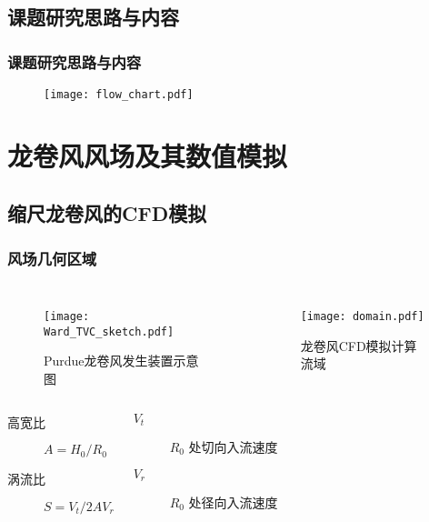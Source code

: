 \subsection{课题研究思路与内容}
\begin{frame}
  \frametitle{课题研究思路与内容}
  \begin{figure}
    \centering
    \texttt{[image: flow\_chart.pdf]} 
  \end{figure}
\end{frame}

\section{龙卷风风场及其数值模拟}
\subsection{缩尺龙卷风的CFD模拟}

\begin{frame}
  \frametitle{风场几何区域}

  \begin{columns}
    \begin{figure}
      \centering
      \texttt{[image: Ward\_TVC\_sketch.pdf]}
      \caption*{Purdue龙卷风发生装置示意图}
      \label{fig:Ward-TVC}
    \end{figure}
   
    \begin{figure}
      \centering
      \texttt{[image: domain.pdf]}
      \caption*{龙卷风CFD模拟计算流域}
      \label{fig:TVC-domain}
    \end{figure}
  \end{columns}

  \begin{columns}
    \begin{description}
    \item[高宽比] $A = H_0/R_0$ 
    \item[涡流比] $S = V_t/2A V_r$
    \end{description}

    \begin{description}
    \item[$V_t$] $R_0$ 处切向入流速度
    \item[$V_r$] $R_0$ 处径向入流速度
    \end{description}
  \end{columns}

\end{frame}

